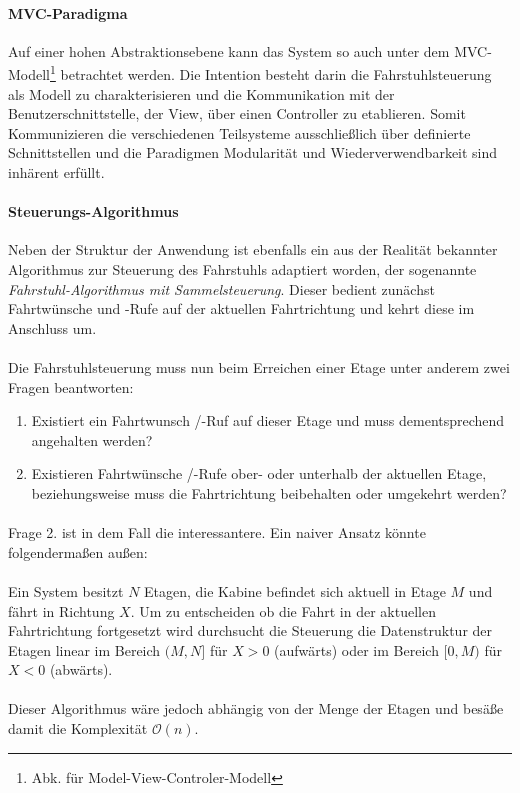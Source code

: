 \paragraph{MVC-Paradigma}
Auf einer hohen Abstraktionsebene kann das System so auch unter dem MVC-Modell\footnote{Abk. für Model-View-Controler-Modell} betrachtet werden.
Die Intention besteht darin die Fahrstuhlsteuerung als Modell zu charakterisieren und die Kommunikation mit der Benutzerschnittstelle, der View, über einen Controller zu etablieren.
Somit Kommunizieren die verschiedenen Teilsysteme ausschließlich über definierte Schnittstellen und die Paradigmen Modularität und Wiederverwendbarkeit sind inhärent erfüllt.

\paragraph{Steuerungs-Algorithmus}
Neben der Struktur der Anwendung ist ebenfalls ein aus der Realität bekannter Algorithmus zur Steuerung des Fahrstuhls adaptiert worden, der sogenannte \textit{Fahrstuhl-Algorithmus mit Sammelsteuerung}\cite{wiki_elev}.
Dieser bedient zunächst Fahrtwünsche und -Rufe auf der aktuellen Fahrtrichtung und kehrt diese im Anschluss um.

\paragraph{}
Die Fahrstuhlsteuerung muss nun beim Erreichen einer Etage unter anderem zwei Fragen beantworten:

\begin{enumerate}
	\item Existiert ein Fahrtwunsch /-Ruf auf dieser Etage und muss dementsprechend angehalten werden?
	\item Existieren Fahrtwünsche /-Rufe ober- oder unterhalb der aktuellen Etage, beziehungsweise muss die Fahrtrichtung beibehalten oder umgekehrt werden?
\end{enumerate}

\paragraph{}
Frage 2. ist in dem Fall die interessantere.
Ein naiver Ansatz könnte folgendermaßen außen:\\ \\ Ein System besitzt $N$ Etagen, die Kabine befindet sich aktuell in Etage $M$ und fährt in Richtung $X$.
Um zu entscheiden ob die Fahrt in der aktuellen Fahrtrichtung fortgesetzt wird durchsucht die Steuerung die Datenstruktur der Etagen linear im Bereich $(M,N]$ für $X>0$ (aufwärts) oder im Bereich $[0,M)$ für $X<0$ (abwärts).\\\\
Dieser Algorithmus wäre jedoch abhängig von der Menge der Etagen und besäße damit die Komplexität $\mathcal{O}(n)$.

